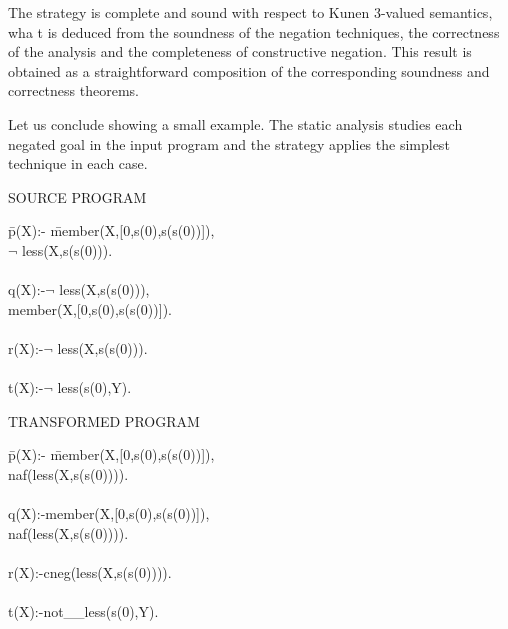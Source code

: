 \documentclass[]{llncs}
\newenvironment{mytabbing}
   {\vspace{0.3em}\begin{small}\begin{tabbing}}
   {\end{tabbing}\end{small}\vspace{0.3em}}
\begin{document}
The strategy is complete and sound with respect to Kunen 3-valued semantics, wha
t is deduced from the soundness
of the negation techniques, the correctness of the analysis and the
completeness of constructive negation. This result is obtained as a 
straightforward composition of the corresponding soundness and correctness
theorems.

Let us conclude showing a small example.  The static analysis studies
each negated goal in the input program and the strategy applies the
simplest technique in each case.

\bigskip

\noindent
\begin{small}
\begin{minipage}[h]{0.5\textwidth}
SOURCE PROGRAM \smallskip
\begin{tt}
\begin{mytabbing}
\= p(X):- \=member(X,[0,s(0),s(s(0))]), \\
  \>       \> $\neg$ less(X,s(s(0))).\\
  \\
  \> q(X):-\>$\neg$ less(X,s(s(0))),\\
  \>       \>member(X,[0,s(0),s(s(0))]).\\
  \\           
  \> r(X):-\>$\neg$ less(X,s(s(0))).\\
  \\
  \> t(X):-\>$\neg$ less(s(0),Y).
\end{mytabbing}
\end{tt}
\end{minipage}
\begin{minipage}[h]{0.5\textwidth}
TRANSFORMED PROGRAM \smallskip
\begin{tt}
\begin{mytabbing}
\= p(X):- \=member(X,[0,s(0),s(s(0))]), \\
 \>       \>naf(less(X,s(s(0)))). \\
 \\
 \>    q(X):-\>member(X,[0,s(0),s(s(0))]), \\
 \>          \>naf(less(X,s(s(0)))). \\
 \\
 \>    r(X):-\>cneg(less(X,s(s(0)))). \\
 \\
 \>    t(X):-\>not\_\_less(s(0),Y).
\end{mytabbing}
\end{tt}
\end{minipage}
\end{small}
\end{document}

